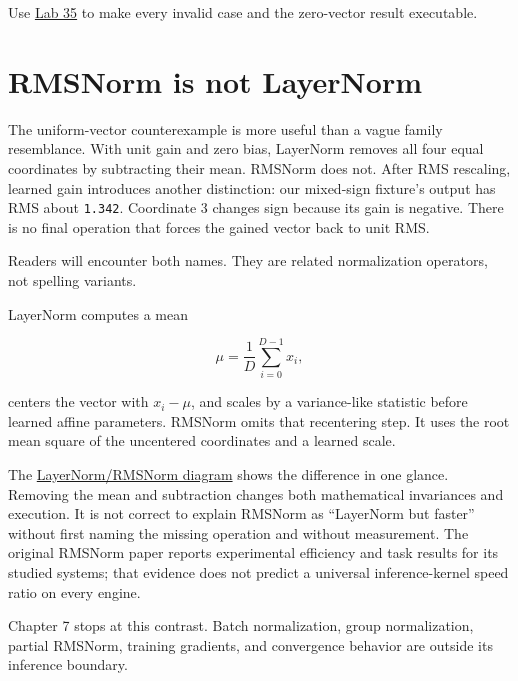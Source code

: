 Use
\href{https://github.com/hermonai/inside-the-llm-engine/blob/astra-visual-rewrite/labs/lab-35-break-epsilon.md}{Lab
35} to make every invalid case and the zero-vector result executable.

\section{RMSNorm is not LayerNorm}\label{rmsnorm-is-not-layernorm}


The uniform-vector counterexample is more useful than a vague family
resemblance. With unit gain and zero bias, LayerNorm removes all four
equal coordinates by subtracting their mean. RMSNorm does not. After RMS
rescaling, learned gain introduces another distinction: our mixed-sign
fixture's output has RMS about \texttt{1.342}. Coordinate 3 changes sign
because its gain is negative. There is no final operation that forces
the gained vector back to unit RMS.

Readers will encounter both names. They are related normalization
operators, not spelling variants.

LayerNorm computes a mean

\begin{equation}
\mu=\frac{1}{D}\sum_{i=0}^{D-1}x_i,
\end{equation}

centers the vector with \(x_i-\mu\), and scales by a variance-like
statistic before learned affine parameters. RMSNorm omits that
recentering step. It uses the root mean square of the uncentered
coordinates and a learned scale.

The
\href{https://github.com/hermonai/inside-the-llm-engine/blob/astra-visual-rewrite/diagrams/transformer/layernorm-vs-rmsnorm.txt}{LayerNorm/RMSNorm
diagram} shows the difference in one glance. Removing the mean and
subtraction changes both mathematical invariances and execution. It is
not correct to explain RMSNorm as ``LayerNorm but faster'' without first
naming the missing operation and without measurement. The original
RMSNorm paper reports experimental efficiency and task results for its
studied systems; that evidence does not predict a universal
inference-kernel speed ratio on every engine.

Chapter 7 stops at this contrast. Batch normalization, group
normalization, partial RMSNorm, training gradients, and convergence
behavior are outside its inference boundary.

